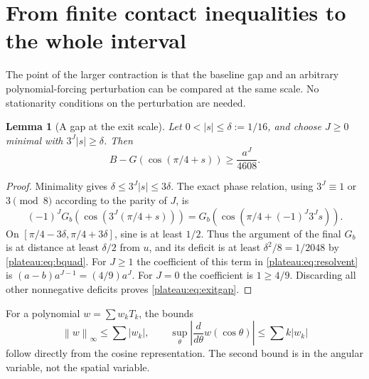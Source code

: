 \documentclass[11pt]{article}
\newtheorem{lemma}[theorem]{Lemma}
\theoremstyle{remark}\newtheorem{remark}[theorem]{Remark}
\newcommand{\norm}[1]{\left\lVert #1\right\rVert_\infty}
\begin{document}
\section{From finite contact inequalities to the whole interval}

The point of the larger contraction is that the baseline gap and an
arbitrary polynomial-forcing perturbation can be compared at the same
scale. No stationarity conditions on the perturbation are needed.

\begin{lemma}[A gap at the exit scale]\label{plateau:lem:exit}
Let $0<|s|\le\delta:=1/16$, and choose $J\ge0$ minimal with
$3^J|s|\ge\delta$. Then
\begin{equation}\label{plateau:eq:exitgap}
 B-G(\cos(\pi/4+s))\ge\frac{a^J}{4608}.
\end{equation}
\end{lemma}
\begin{proof}
Minimality gives $\delta\le3^J|s|\le3\delta$. The exact phase relation,
using $3^J\equiv1$ or $3\pmod8$ according to the parity of $J$, is
\[
 (-1)^JG_b(\cos(3^J(\pi/4+s)))
 =G_b(\cos(\pi/4+(-1)^J3^Js)).
\]
On $[\pi/4-3\delta,\pi/4+3\delta]$, sine is at least $1/2$.
Thus the argument of the final $G_b$ is at distance at least
$\delta/2$ from $u$, and its deficit is at least
$\delta^2/8=1/2048$ by \eqref{plateau:eq:bquad}.
For $J\ge1$ the coefficient of this term in \eqref{plateau:eq:resolvent} is
$(a-b)a^{J-1}=(4/9)a^J$. For $J=0$ the coefficient is $1\ge4/9$.
Discarding all other nonnegative deficits proves \eqref{plateau:eq:exitgap}.
\end{proof}

For a polynomial $w=\sum w_kT_k$, the bounds
\[
 \norm w\le\sum|w_k|,\qquad
 \sup_\theta\left|\frac{d}{d\theta}w(\cos\theta)\right|
 \le\sum k|w_k|
\]
follow directly from the cosine representation. The second bound is in
the angular variable, not the spatial variable.
\end{document}
